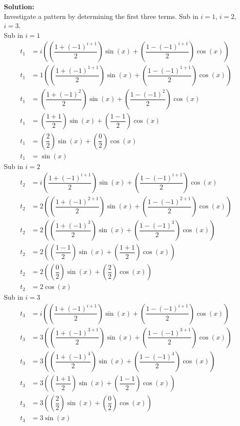 \documentclass[12pt]{book}
\begin{document}
\begin{enumerate}
\begin{enumerate}
\textbf{Solution:}\\
Investigate a pattern by determining the first three terms. Sub in $i = 1$, $i = 2$, $i = 3$.\\
Sub in $i = 1$
\begin{align*}
    t_1 &= i \left(\left(\dfrac{1+(-1)^{i+1}}{2}\right)\sin(x) + \left(\dfrac{1-(-1)^{i+1}}{2}\right)\cos(x)\right) \\
    t_1 &= 1 \left(\left(\dfrac{1+(-1)^{1+1}}{2}\right)\sin(x) + \left(\dfrac{1-(-1)^{1+1}}{2}\right)\cos(x)\right)\\
    t_1 &= \left(\dfrac{1+(-1)^{2}}{2}\right)\sin(x) + \left(\dfrac{1-(-1)^{2}}{2}\right)\cos(x) \\
    t_1 &= \left(\dfrac{1+1}{2}\right)\sin(x) + \left(\dfrac{1-1}{2}\right)\cos(x) \\
    t_1 &= \left(\dfrac{2}{2}\right)\sin(x) + \left(\dfrac{0}{2}\right)\cos(x) \\
    t_1 &= \sin(x)
\end{align*}
Sub in $i = 2$
\begin{align*}
    t_2 &= i \left(\dfrac{1+(-1)^{i+1}}{2}\right)\sin(x) + \left(\dfrac{1-(-1)^{i+1}}{2}\right)\cos(x) \\
    t_2 &= 2 \left(\left(\dfrac{1+(-1)^{2+1}}{2}\right)\sin(x) + \left(\dfrac{1-(-1)^{2+1}}{2}\right)\cos(x)\right)\\
    t_2 &= 2 \left(\left(\dfrac{1+(-1)^{3}}{2}\right)\sin(x) + \left(\dfrac{1-(-1)^{3}}{2}\right)\cos(x)\right) \\
    t_2 &= 2 \left(\left(\dfrac{1-1}{2}\right)\sin(x) + \left(\dfrac{1+1}{2}\right)\cos(x)\right) \\
    t_2 &= 2 \left(\left(\dfrac{0}{2}\right)\sin(x) + \left(\dfrac{2}{2}\right)\cos(x) \right)\\
    t_2 &= 2\cos(x) 
\end{align*}
Sub in $i = 3$
\begin{align*}
    t_3 &= i \left(\left(\dfrac{1+(-1)^{i+1}}{2}\right)\sin(x) + \left(\dfrac{1-(-1)^{i+1}}{2}\right)\cos(x)\right) \\
    t_3 &= 3 \left(\left(\dfrac{1+(-1)^{3+1}}{2}\right)\sin(x) + \left(\dfrac{1-(-1)^{3+1}}{2}\right)\cos(x)\right) \\
    t_3 &= 3 \left(\left(\dfrac{1+(-1)^{4}}{2}\right)\sin(x) + \left(\dfrac{1-(-1)^{4}}{2}\right)\cos(x) \right)\\
    t_3 &= 3 \left(\left(\dfrac{1+1}{2}\right)\sin(x) + \left(\dfrac{1-1}{2}\right)\cos(x)\right) \\
    t_3 &= 3 \left(\left(\dfrac{2}{2}\right)\sin(x) + \left(\dfrac{0}{2}\right)\cos(x)\right) \\
    t_3 &= 3\sin(x)
\end{align*}


\end{enumerate}
\end{enumerate}
\end{document}
